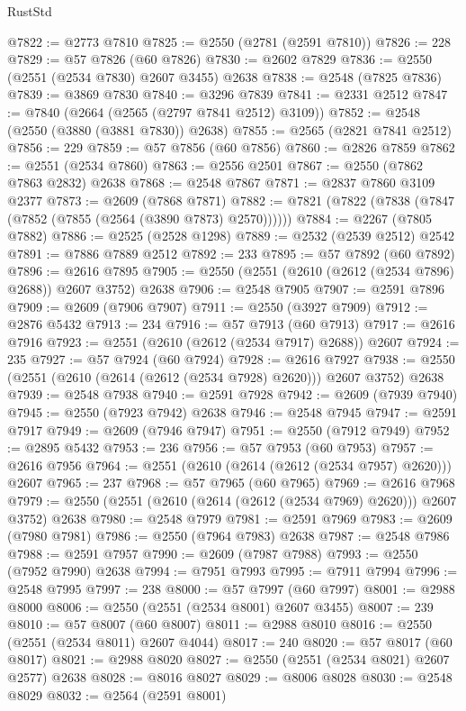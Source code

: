 \begin{lexlean}{RustStd}
\begin{coremodule}
@7822 := @2773 @7810
@7825 := @2550 (@2781 (@2591 @7810))
@7826 := 228
@7829 := @57 @7826 (@60 @7826)
@7830 := @2602 @7829
@7836 := @2550 (@2551 (@2534 @7830) @2607 @3455) @2638
@7838 := @2548 (@7825 @7836)
@7839 := @3869 @7830
@7840 := @3296 @7839
@7841 := @2331 @2512
@7847 := @7840 (@2664 (@2565 (@2797 @7841 @2512) @3109))
@7852 := @2548 (@2550 (@3880 (@3881 @7830)) @2638)
@7855 := @2565 (@2821 @7841 @2512)
@7856 := 229
@7859 := @57 @7856 (@60 @7856)
@7860 := @2826 @7859
@7862 := @2551 (@2534 @7860)
@7863 := @2556 @2501
@7867 := @2550 (@7862 @7863 @2832) @2638
@7868 := @2548 @7867
@7871 := @2837 @7860 @3109 @2377
@7873 := @2609 (@7868 @7871)
@7882 := @7821 (@7822 (@7838 (@7847 (@7852 (@7855 (@2564 (@3890 @7873) @2570))))))
@7884 := @2267 (@7805 @7882)
@7886 := @2525 (@2528 @1298)
@7889 := @2532 (@2539 @2512) @2542
@7891 := @7886 @7889 @2512
@7892 := 233
@7895 := @57 @7892 (@60 @7892)
@7896 := @2616 @7895
@7905 := @2550 (@2551 (@2610 (@2612 (@2534 @7896) @2688)) @2607 @3752) @2638
@7906 := @2548 @7905
@7907 := @2591 @7896
@7909 := @2609 (@7906 @7907)
@7911 := @2550 (@3927 @7909)
@7912 := @2876 @5432
@7913 := 234
@7916 := @57 @7913 (@60 @7913)
@7917 := @2616 @7916
@7923 := @2551 (@2610 (@2612 (@2534 @7917) @2688)) @2607
@7924 := 235
@7927 := @57 @7924 (@60 @7924)
@7928 := @2616 @7927
@7938 := @2550 (@2551 (@2610 (@2614 (@2612 (@2534 @7928) @2620))) @2607 @3752) @2638
@7939 := @2548 @7938
@7940 := @2591 @7928
@7942 := @2609 (@7939 @7940)
@7945 := @2550 (@7923 @7942) @2638
@7946 := @2548 @7945
@7947 := @2591 @7917
@7949 := @2609 (@7946 @7947)
@7951 := @2550 (@7912 @7949)
@7952 := @2895 @5432
@7953 := 236
@7956 := @57 @7953 (@60 @7953)
@7957 := @2616 @7956
@7964 := @2551 (@2610 (@2614 (@2612 (@2534 @7957) @2620))) @2607
@7965 := 237
@7968 := @57 @7965 (@60 @7965)
@7969 := @2616 @7968
@7979 := @2550 (@2551 (@2610 (@2614 (@2612 (@2534 @7969) @2620))) @2607 @3752) @2638
@7980 := @2548 @7979
@7981 := @2591 @7969
@7983 := @2609 (@7980 @7981)
@7986 := @2550 (@7964 @7983) @2638
@7987 := @2548 @7986
@7988 := @2591 @7957
@7990 := @2609 (@7987 @7988)
@7993 := @2550 (@7952 @7990) @2638
@7994 := @7951 @7993
@7995 := @7911 @7994
@7996 := @2548 @7995
@7997 := 238
@8000 := @57 @7997 (@60 @7997)
@8001 := @2988 @8000
@8006 := @2550 (@2551 (@2534 @8001) @2607 @3455)
@8007 := 239
@8010 := @57 @8007 (@60 @8007)
@8011 := @2988 @8010
@8016 := @2550 (@2551 (@2534 @8011) @2607 @4044)
@8017 := 240
@8020 := @57 @8017 (@60 @8017)
@8021 := @2988 @8020
@8027 := @2550 (@2551 (@2534 @8021) @2607 @2577) @2638
@8028 := @8016 @8027
@8029 := @8006 @8028
@8030 := @2548 @8029
@8032 := @2564 (@2591 @8001)

\end{coremodule}
\end{lexlean}
